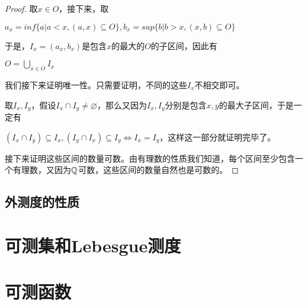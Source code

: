 \documentclass[12pt, a4paper, oneside, UTF8]{ctexbook}
\begin{document}
		\begin{proof}
			取$x \in O$，接下来，取
			
			$a_x = inf \{a| a<x,(a,x) \subseteq O\},b_x = sup \{b|b>x,(x,b) \subseteq O\}$
			
			于是，$I_x = (a_x,b_x)$是包含$x$的最大的$O$的子区间，因此有
			
			$O = \bigcup_{x \in O} I_x$
			
			我们接下来证明唯一性。只需要证明，不同的这些$I_x$不相交即可。
			
			取$I_x,I_y$，假设$I_x \cap I_y \neq \varnothing$，那么又因为$I_x,I_y$分别是包含$x,y$的最大子区间，于是一定有
			
			$(I_x \cap I_y) \subseteq I_x,(I_y \cap I_x) \subseteq I_y \Leftrightarrow I_x = I_y$，这样这一部分就证明完毕了。
			
			接下来证明这些区间的数量可数。由有理数的性质我们知道，每个区间至少包含一个有理数，又因为$\mathbb{Q}$可数，这些区间的数量自然也是可数的。
		\end{proof}
		\subsection{外测度的性质}
	\section{可测集和Lebesgue测度}
	\section{可测函数}
\ifx\allfiles\undefined
\end{document}
